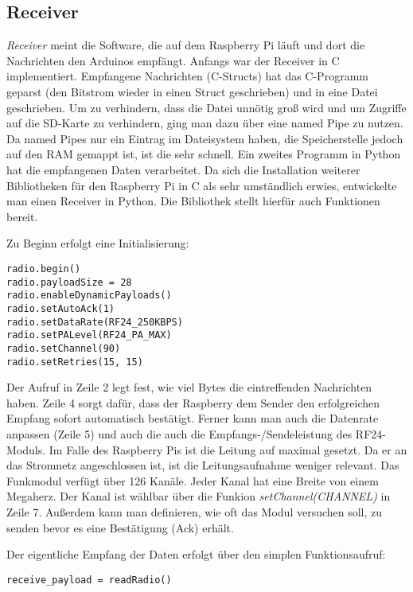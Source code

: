 \subsection{Receiver}
\label{sec:receiver}
\textit{Receiver} meint die Software, die auf dem Raspberry Pi läuft und dort die Nachrichten den Arduinos empfängt. Anfangs war der Receiver in C implementiert. Empfangene Nachrichten (C-Structs) hat das C-Programm geparst (den Bitstrom wieder in einen Struct geschrieben) und in eine Datei geschrieben. Um zu verhindern, dass die Datei unnötig groß wird und um Zugriffe auf die SD-Karte zu verhindern, ging man dazu über eine named Pipe zu nutzen. Da named Pipes nur ein Eintrag im Dateisystem haben, die Speicherstelle jedoch auf den RAM gemappt ist, ist die sehr schnell. Ein zweites Programm in Python hat die empfangenen Daten verarbeitet. 
Da sich die Installation weiterer Bibliotheken für den Raspberry Pi in C als sehr umständlich erwies, entwickelte man einen Receiver in Python. Die Bibliothek stellt hierfür auch Funktionen bereit. 

Zu Beginn erfolgt eine Initialisierung:
\lstset{language=python, numbers=left}
\begin{lstlisting}
radio.begin()
radio.payloadSize = 28
radio.enableDynamicPayloads()
radio.setAutoAck(1)
radio.setDataRate(RF24_250KBPS)
radio.setPALevel(RF24_PA_MAX)
radio.setChannel(90)
radio.setRetries(15, 15)
\end{lstlisting}
Der Aufruf in Zeile 2 legt fest, wie viel Bytes die eintreffenden Nachrichten haben. Zeile 4 sorgt dafür, dass der Raspberry dem Sender den erfolgreichen Empfang sofort automatisch bestätigt. Ferner kann man auch die Datenrate anpassen (Zeile 5) und auch die auch die Empfangs-/Sendeleistung des RF24-Moduls. Im Falle des Raspberry Pis ist die Leitung auf maximal gesetzt. Da er an das Stromnetz angeschlossen ist, ist die Leitungsaufnahme weniger relevant. Das Funkmodul verfügt über 126 Kanäle. Jeder Kanal hat eine Breite von einem Megaherz. Der Kanal ist wählbar über die Funkion \textit{setChannel(CHANNEL)} in Zeile 7. Außerdem kann man definieren, wie oft das Modul versuchen soll, zu senden bevor es eine Bestätigung (Ack) erhält.

Der eigentliche Empfang der Daten erfolgt über den simplen Funktionsaufruf:
\lstset{language=python, numbers=none}
\begin{lstlisting}
receive_payload = readRadio()
\end{lstlisting}



